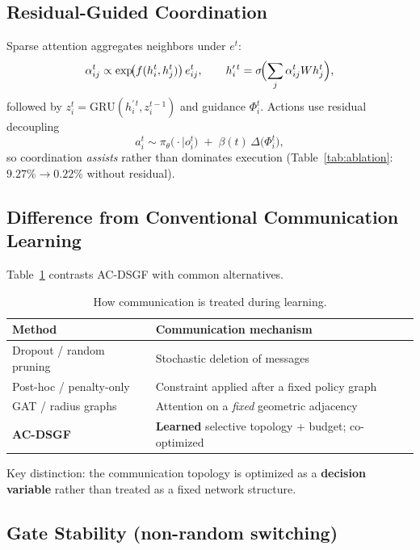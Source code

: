 \subsection{Residual-Guided Coordination}
\label{sec:residual}

Sparse attention aggregates neighbors under $e^{t}$:
\begin{equation}
\alpha_{ij}^{t}
\propto
\exp\!\bigl(f(h_i^{t},h_j^{t})\bigr)\,e_{ij}^{t},
\qquad
h_i^{\prime\,t}
=
\sigma\!\Bigl(
\sum_{j}
\alpha_{ij}^{t} W h_j^{t}
\Bigr),
\label{eq:attn}
\end{equation}
followed by $z_i^{t}=\mathrm{GRU}(h_i^{\prime\,t},z_i^{t-1})$ and guidance
$\Phi_i^{t}$.
Actions use residual decoupling
\begin{equation}
a_i^{t}
\sim
\pi_{\theta}\!\bigl(\cdot\mid o_i^{t}\bigr)
\;+\;
\beta(t)\,
\Delta\!\bigl(\Phi_i^{t}\bigr),
\label{eq:residual}
\end{equation}
so coordination \emph{assists} rather than dominates execution
(Table~\ref{tab:ablation}: $9.27\%\!\rightarrow\!0.22\%$ without residual).

\subsection{Difference from Conventional Communication Learning}
\label{sec:diff-comm}

Table~\ref{tab:comm-diff} contrasts AC-DSGF with common alternatives.
\begin{table}[t]
\centering
\caption{How communication is treated during learning.}
\label{tab:comm-diff}
\begin{tabular}{ll}
\toprule
Method & Communication mechanism \\
\midrule
Dropout / random pruning & Stochastic deletion of messages \\
Post-hoc / penalty-only & Constraint applied after a fixed policy graph \\
GAT / radius graphs & Attention on a \emph{fixed} geometric adjacency \\
\textbf{AC-DSGF} & \textbf{Learned} selective topology + budget; co-optimized \\
\bottomrule
\end{tabular}
\end{table}
\noindent
Key distinction: the communication topology is optimized as a
\textbf{decision variable} rather than treated as a fixed network structure.

\subsection{Gate Stability (non-random switching)}
\label{sec:gate-stable}

